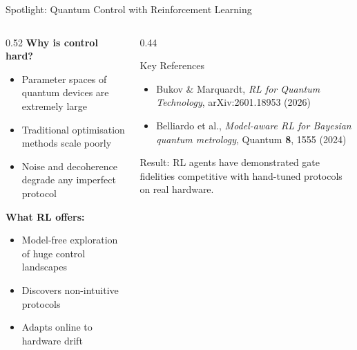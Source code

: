 \documentclass[aspectratio=169]{beamer}
\begin{document}
\begin{frame}{Spotlight: Quantum Control with Reinforcement Learning}

  \begin{columns}[T]
    \begin{column}{0.52\textwidth}
      \textbf{Why is control hard?}
      \begin{itemize}
        \item Parameter spaces of quantum devices are extremely large
        \item Traditional optimisation methods scale poorly
        \item Noise and decoherence degrade any imperfect protocol
      \end{itemize}
      \bigskip
      \textbf{What RL offers:}
      \begin{itemize}
        \item Model-free exploration of huge control landscapes
        \item Discovers non-intuitive protocols
        \item Adapts online to hardware drift
      \end{itemize}
    \end{column}
    \begin{column}{0.44\textwidth}
      \begin{block}{Key References}
        \footnotesize
        \begin{itemize}
          \item Bukov \& Marquardt,
                \emph{RL for Quantum Technology},
                arXiv:2601.18953 (2026)
          \item Belliardo et al.,
                \emph{Model-aware RL for Bayesian quantum metrology},
                Quantum \textbf{8}, 1555 (2024)
        \end{itemize}
      \end{block}
      \medskip
      \small
      \textcolor{mqblue}{Result:} RL agents have demonstrated gate
      fidelities competitive with hand-tuned protocols on real hardware.
    \end{column}
  \end{columns}

\end{frame}
\end{document}
